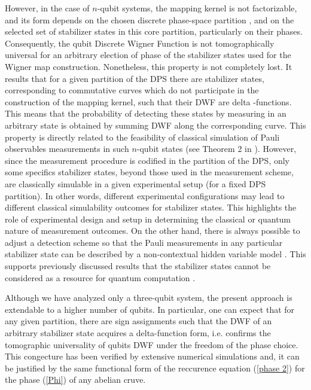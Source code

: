 \documentclass{article}
\begin{document}
However, in the case of $n$-qubit systems, the mapping kernel is not
factorizable, and its form depends on the chosen discrete phase-space
partition \cite{Bjork2007}, and on the selected set of stabilizer states in
this core partition, particularly on their phases. Consequently, the qubit
Discrete Wigner Function is not tomographically universal for an arbitrary
election of phase of the stabilizer states used for the Wigner map
construction. Nonetheless, this property is not completely lost. It results
that for a given partition of the DPS there are stabilizer states,
corresponding to commutative curves which do not participate in the
construction of the mapping kernel, such that their DWF are delta
-functions. This means that the probability of detecting these states by
measuring in an arbitrary state is obtained by summing DWF along the
corresponding curve. This property is directly related to the feasibility of
classical simulation of Pauli observables measurements in such $n$-qubit
states (see Theorem 2 in \cite{Raus17}). However, since the measurement
procedure is codified in the partition of the DPS, only some specifics
stabilizer states, beyond those used in the measurement scheme, are
classically simulable in a given experimental setup (for a fixed DPS
partition). In other words, different experimental configurations may lead
to different classical simulability outcomes for stabilizer states. This
highlights the role of experimental design and setup in determining the
classical or quantum nature of measurement outcomes. On the other hand,
there is always possible to adjust a detection scheme so that the Pauli
measurements in any particular stabilizer state can be described by a
non-contextual hidden variable model . This supports previously discussed
results \cite{Raus17,contextMagic} that the stabilizer states cannot be
considered as a resource for quantum computation \cite{gottKnill}.

Although we have analyzed only a three-qubit system, the present approach is
extendable to a higher number of qubits. In particular, one can expect that
for any given partition, there are sign assignments such that the DWF of an
arbitrary stabilizer state acquires a delta-function form, i.e. confirms the
tomographic universality of qubits DWF under the freedom of the phase
choice. This congecture has been verified by extensive numerical simulations
and, it can be justified by the same functional form of the reccurence
equation (\ref{phase 2}) for the phase (\ref{Phi}) of any abelian cruve.
\end{document}
